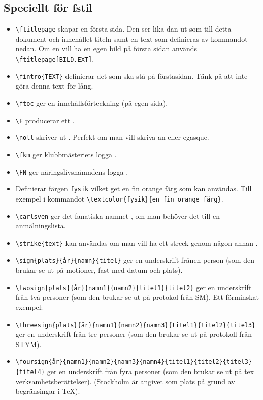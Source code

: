 \documentclass[a4paper]{article}
\newcommand{\bs}{\textbackslash}
\begin{document}
\subsection{Speciellt för fstil}
\begin{itemize}
\item \texttt{\bs ftitlepage} skapar en första sida. Den ser lika dan ut som till detta dokument och innehållet titeln samt en text som definieras av kommandot nedan. Om en vill ha en egen bild på första sidan används \texttt{\bs ftitlepage[BILD.EXT]}.
\item \texttt{\bs fintro\{TEXT\}} definierar det som ska stå på förstasidan. Tänk på att inte göra denna text för lång.
\item \texttt{\bs ftoc} ger en innehållsförteckning (på egen sida).
\item \texttt{\bs F} producerar ett \F.
\item \texttt{\bs noll} skriver ut \noll. Perfekt om man vill skriva \noll an eller \noll egasque.
\item \texttt{\bs fkm} ger klubbmästeriets logga \fkm.
\item \texttt{\bs FN} ger näringslivsnämndens logga \FN.
\item Definierar färgen \texttt{fysik} vilket get \textcolor{fysik}{en fin orange färg} som kan användas. Till exempel i kommandot \texttt{\bs textcolor\{fysik\}\{en fin orange färg\}}.
\item \texttt{\bs carlsven} ger det fanatiska namnet \carlsven, om man behöver det till en anmälningslista.
\item \texttt{\bs strike\{text\}} kan användas om man vill ha ett streck genom någon annan .
\item \texttt{\bs sign\{plats\}\{år\}\{namn\}\{titel\}} ger en underskrift frånen person (som den brukar se ut på motioner, fast med datum och plats).
\item \texttt{\bs twosign\{plats\}\{år\}\{namn1\}\{namn2\}\{titel1\}\{titel2\}} ger en underskrift från två personer (som den brukar se ut på protokol från SM). Ett förminskat exempel: {\footnotesize
{}
}
\item \texttt{\bs threesign\{plats\}\{år\}\{namn1\}\{namn2\}\{namn3\}\{titel1\}\{titel2\}\{titel3\}} ger en underskrift från tre personer (som den brukar se ut på protokoll från STYM).
\item \texttt{\bs foursign\{år\}\{namn1\}\{namn2\}\{namn3\}\{namn4\}\{titel1\}\{titel2\}\{titel3\}\{titel4\}} ger en underskrift från fyra personer (som den brukar se ut på tex verksamhetsberättelser). (Stockholm är angivet som plats på grund av begränsingar i \TeX).

\end{itemize}
\end{document}
